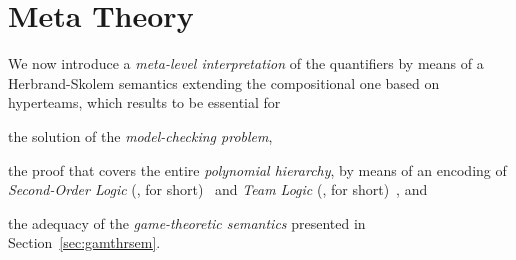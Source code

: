 \documentclass[authoryear]{elsarticle}
\begin{document}









\section{Meta Theory}
\label{sec:metthr}

We now introduce a \emph{meta-level interpretation} of the quantifiers by means
of a Herbrand-Skolem semantics extending the compositional one based on
hyperteams, which results to be essential for
\begin{inparaenum}[1)]
  \item
    the solution of the \emph{model-checking problem},
  \item
    the proof that \ADIF covers the entire \emph{polynomial hierarchy}, by means
    of an encoding of \emph{Second-Order Logic} (\SOL, for
    short)~\citep{HA38,Chu56,Sha91} and \emph{Team Logic} (\TL, for
    short)~\citep{Vaa07}, and
  \item
    the adequacy of the \emph{game-theoretic semantics} presented in
    Section~\ref{sec:gamthrsem}.
\end{inparaenum}
\end{document}

